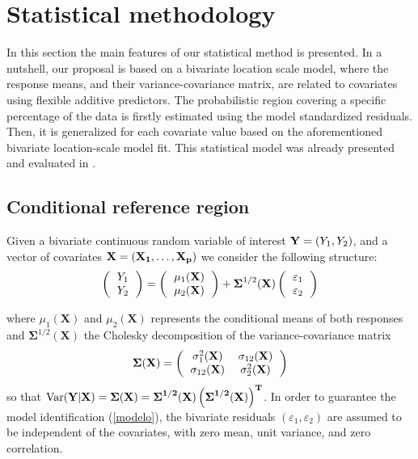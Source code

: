 \section{Statistical methodology}

In this section the main features of our statistical method is presented. In a nutshell, our proposal is based on a bivariate location scale model, where the response means, and their variance-covariance matrix, are related to covariates using flexible additive predictors. The probabilistic region covering a specific percentage of the data is firstly estimated using the model standardized residuals. Then, it is generalized for each covariate value based on the  aforementioned bivariate location-scale model fit. This statistical model was already presented and evaluated in \citep{roca2020nonparametric}.

\subsection{Conditional reference region}

Given a bivariate continuous random variable of interest ${\bf Y} = (Y_1, Y_2)$, and a vector of covariates $\bf{X}=(X_1, \ldots, X_p)$ we consider the following structure:
\begin{equation}
\left( {
	\begin{tabular} {c}
	$Y_1$ \\
	$Y_2$\
	\end{tabular}
}\right) = \left( {
	\begin{tabular} {c}
	$\mu_1(\textbf{X})$ \\
	$\mu_2(\textbf{X})$\
	\end{tabular}
}\right)
+  \boldsymbol{\Sigma}^{1/2} (\textbf{X})
\left( {
	\begin{tabular} {c}
	$\varepsilon_1$ \\
	$\varepsilon_2$\\
	\end{tabular}
}\right)
\label{modelo}
\end{equation}


\noindent
where $\mu_1(\textbf{X})$ and $\mu_2(\textbf{X})$ represents the conditional means of both responses and $\boldsymbol{\Sigma}^{1/2} (\textbf{X})$ the Cholesky decomposition of the variance-covariance matrix
\begin{equation}
\boldsymbol{\Sigma} (\textbf{X})=\left({
	\begin{tabular} {cc}
	$\sigma_1^2 (\textbf{X})$  &  $ \sigma_{12} (\textbf{X})$\\
	$\sigma_{12} (\textbf{X})$ & $\sigma_2^2 (\textbf{X})$  \\
	\end{tabular}}\right)
\label{mod1}
\end{equation}
\noindent
so that $\text{Var} (\bf Y|\textbf{X})=\boldsymbol{\Sigma} (\textbf{X})=
\boldsymbol{\Sigma}^{1/2} (\textbf{X})\left({\boldsymbol{\Sigma}^{1/2} (\textbf{X})}\right)^T$. In order to guarantee the model identification (\ref{modelo}), the bivariate residuals $(\varepsilon_1,\varepsilon_2)$ are assumed to be independent of the covariates, with zero mean, unit variance, and zero correlation. 


